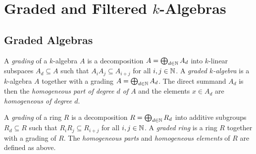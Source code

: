 \section{Graded and Filtered \texorpdfstring{$k$}{k}-Algebras}





\subsection{Graded Algebras}

\begin{definition}
  \label{definition: gradings and graded algebras}
  A \emph{grading} of a $k$-algebra $A$ is a decomposition $A = \bigoplus_{d \in \mathbb{N}} A_d$ into $k$-linear subspaces $A_d \subseteq A$ such that $A_i A_j \subseteq A_{i+j}$ for all $i,j \in \mathbb{N}$.
  A \emph{graded $k$-algebra} is a $k$-algebra $A$ together with a grading $A = \bigoplus_{d \in \mathbb{N}} A_d$.
  The direct summand $A_d$ is then the \emph{homogeneous part of degree $d$ of $A$} and the elements $x \in A_d$ are \emph{homogeneous of degree $d$}.
  
  A \emph{grading} of a ring $R$ is a decomposition $R = \bigoplus_{d \in \mathbb{N}} R_d$ into additive subgroups $R_d \subseteq R$ such that $R_i R_j \subseteq R_{i+j}$ for all $i,j \in \mathbb{N}$.
  A \emph{graded ring} is a ring $R$ together with a grading of $R$.
  The \emph{homogeneous parts} and \emph{homogeneous elements} of $R$ are defined as above.
\end{definition}

